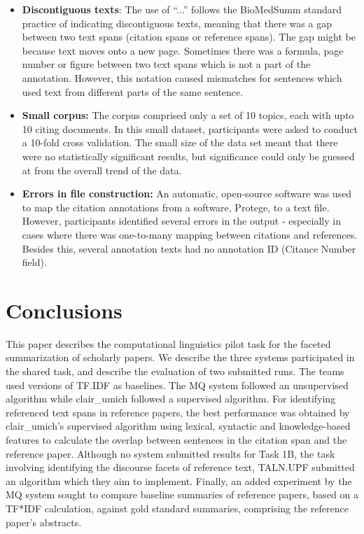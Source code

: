 \documentclass[11pt]{article}
\begin{document}
\begin{itemize}
\vspace{-.3cm}
\item \textbf{Discontiguous texts}: The use of ``...''  follows the BioMedSumm standard practice of indicating discontiguous texts, meaning that there was a gap between two text spans (citation spans or reference spans). The gap might be because text moves onto a new page. Sometimes there was a formula, page number or figure between two text spans which is not a part of the annotation. However, this notation caused mismatches for sentences which used text from different parts of the same sentence.
\vspace{-.3cm}
\item \textbf{Small corpus:} The corpus comprised only a set of 10 topics, each with upto 10 citing documents. In this small
  dataset, participants were asked to conduct a 10-fold cross validation. The small size of the data set meant that there were no
  statistically significant results, but significance could only be guessed at from the overall trend of the data.
\vspace{-.3cm}
\item \textbf{Errors in file construction:} An automatic, open-source software was used to map the citation annotations from a software, Protege, to a text file.  However, participants identified several errors in the output - especially in cases where there was one-to-many mapping between citations and references.  Besides this, several annotation texts had no annotation ID (Citance Number field).
\end{itemize}

\section{Conclusions}
This paper describes the computational linguistics pilot task for the
faceted summarization of scholarly papers. We describe the three
systems participated in the shared task, and describe the evaluation
of two submitted runs. The teams used versions of TF.IDF as baselines.
The MQ system followed an unsupervised algorithm while
clair\_umich followed a supervised algorithm. For identifying
referenced text spans in reference papers, the best performance was
obtained by clair\_umich's supervised algorithm using lexical,
syntactic and knowledge-based features to calculate the overlap
between sentences in the citation span and the reference
paper. Although no system submitted results for Task 1B, the task
involving identifying the discourse facets of reference text, TALN.UPF
submitted an algorithm which they aim to implement.  Finally, an added
experiment by the MQ system sought to compare baseline summaries of
reference papers, based on a TF*IDF calculation, against gold standard
summaries, comprising the reference paper's abstracts.
 
\end{document}
